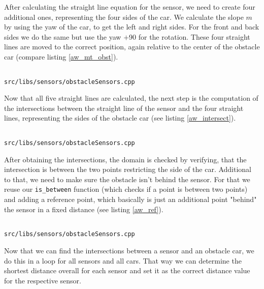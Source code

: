\documentclass[paper=a4, fontsize=11pt]{scrreprt}
\begin{document}
After calculating the straight line equation for the sensor,
we need to create four additional ones, representing the four sides of the car.
We calculate the slope $m$ by using the yaw of the car, to get the left and right sides.
For the front and back sides we do the same but use the yaw $+$90\degree{} for the rotation.
These four straight lines are moved to the correct position,
again relative to the center of the obstacle car (compare listing \ref{aw_mt_obst}).

\begin{listing}[ht]
  \inputminted[firstline=130,linenos=true,lastline=152,gobble=3]{c++}{../../../simulators/speed-dreams/src/libs/sensors/obstacleSensors.cpp}
  \caption{\texttt{src/libs/sensors/obstacleSensors.cpp}}\label{aw_mt_obst}
\end{listing}

Now that all five straight lines are calculated,
the next step is the computation of the intersections between the straight line of the sensor
and the four straight lines, representing the sides of the obstacle car (see listing \ref{aw_intersect}).

\begin{listing}[ht]
  \inputminted[firstline=154,linenos=true,lastline=164,gobble=3]{c++}{../../../simulators/speed-dreams/src/libs/sensors/obstacleSensors.cpp}
  \caption{\texttt{src/libs/sensors/obstacleSensors.cpp}}\label{aw_intersect}
\end{listing}

After obtaining the intersections, the domain is checked by verifying,
that the intersection is between the two points restricting the side of the car.
Additional to that, we need to make sure the obstacle isn't behind the sensor.
For that we reuse our \texttt{is\_between} function (which checks if a point is between two points) and adding a reference point,
which basically is just an additional point "behind" the sensor in a fixed distance (see listing \ref{aw_ref}).

\begin{listing}[ht]
  \inputminted[firstline=98,linenos=true,lastline=99,gobble=2]{c++}{../../../simulators/speed-dreams/src/libs/sensors/obstacleSensors.cpp}
  \caption{\texttt{src/libs/sensors/obstacleSensors.cpp}}\label{aw_ref}
\end{listing}

Now that we can find the intersections between a sensor and an obstacle car,
we do this in a loop for all sensors and all cars.
That way we can determine the shortest distance overall for each sensor
and set it as the correct distance value for the respective sensor.
\end{document}
